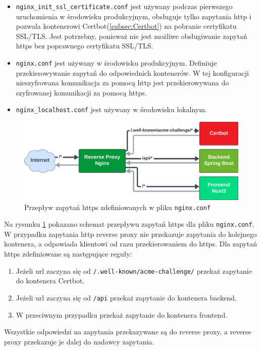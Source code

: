 \documentclass[shortabstract]{iithesis}
\begin{document}
\begin{itemize}
    \item \texttt{nginx\_init\_ssl\_certificate.conf} jest używany podczas pierwszego uruchomienia w środowisku produkcyjnym, obsługuje tylko zapytania http i pozwala kontenerowi Certbot(\ref{subsec:Certbot}) na pobranie certyfikatu SSL/TLS. Jest potrzebny, ponieważ nie jest możliwe obsługiwanie zapytań https bez poprawnego certyfikatu SSL/TLS.
    \item \texttt{nginx.conf} jest używany w środowisku produkcyjnym. Definiuje przekierowywanie zapytań do odpowiednich kontenerów. W tej konfiguracji nieszyfrowana komunikacja za pomocą http jest przekierowywana do szyfrowanej komunikacji za pomocą https.
    \item \texttt{nginx\_localhost.conf} jest używany w środowisku lokalnym.
\end{itemize}
\begin{figure}[H]
    \centering
    \includegraphics[width=\textwidth]{assets/przepływ_zapytań_http.png}
    \caption{Przepływ zapytań https zdefiniowanych w pliku \texttt{nginx.conf}}
    \label{fig:https_requests_flow}
\end{figure}
Na rysunku \ref{fig:https_requests_flow} pokazano schemat przepływu zapytań https dla pliku \texttt{nginx.conf}.
W przypadku zapytania http reverse proxy nie przekazuje zapytania do kolejnego kontenera, a odpowiada klientowi od razu przekierowaniem do https. Dla zapytań https zdefiniowane są następujące reguły:
\begin{enumerate}
    \item Jeżeli url zaczyna się od \texttt{/.well-known/acme-challenge/} przekaż zapytanie do kontenera Certbot.
    \item Jeżeli url zaczyna się od \texttt{/api} przekaż zapytanie do kontenera backend.
    \item W przeciwnym przypadku przekaż zapytanie do kontenera frontend.
\end{enumerate}
Wszystkie odpowiedzi na zapytania przekazywane są do reverse proxy, a reverse proxy przekazuje je dalej do nadawcy zapytania.
\end{document}
